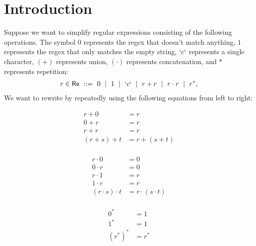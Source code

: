 \tableofcontents

\newpage
\section{Introduction}

\newcommand{\emp}{0}
\newcommand{\eps}{1}
\newcommand{\seq}{\cdot}
\newcommand{\md}{\ \mid \ }

Suppose we want to simplify regular expressions consisting of the following operations.
The symbol $0$ represents the regex that doesn't match anything, $1$ represents the regex that only matches the empty string,
$`c`$ represents a single character, $(+)$ represents union, $(\cdot)$ represents concatenation, and $*$ represents repetition:
\begin{align*}
  r \in \mathsf{Re} \ ::=\  \emp \md \eps \md `c` \md r + r \md r \seq r \md r^*,
\end{align*}
We want to rewrite by repeatedly using the following equations from left to right: \vspace{-0.7cm}

\begin{minipage}[t]{0.3\textwidth}
  \begin{align*}
    r + \emp &= r \\
    \emp + r &= r \\
    r + r &= r \\
    (r + s) + t &= r + (s + t) \\
  \end{align*}
\end{minipage}
\begin{minipage}[t]{0.3\textwidth}
  \begin{align*}
    r \seq \emp &= \emp \\
    \emp \seq r &= \emp \\
    r \seq \eps &= r \\
    \eps \seq r &= r \\
    (r \seq s) \seq t &= r \seq (s \seq t) \\
  \end{align*}
\end{minipage}
\begin{minipage}[t]{0.3\textwidth}
  \begin{align*}
    \emp^* &= \eps \\
    \eps^* &= \eps \\
    (r^*)^* &= r^*
  \end{align*}
\end{minipage}

